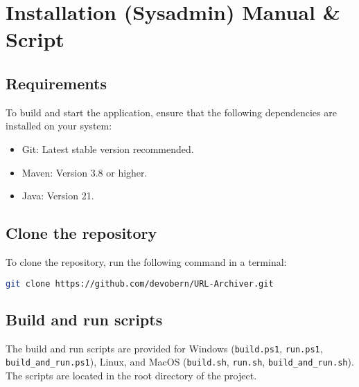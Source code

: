 
\section{Installation (Sysadmin) Manual \& Script} \label{sec::installation_manual}
\subsection{Requirements}

To build and start the application, ensure that the following dependencies are installed on your system:
\begin{itemize}
	\item Git: Latest stable version recommended.
	\item Maven: Version 3.8 or higher.
	\item Java: Version 21.
\end{itemize}

\subsection{Clone the repository}

To clone the repository, run the following command in a terminal:

\begin{lstlisting}[language=bash]
git clone https://github.com/devobern/URL-Archiver.git
\end{lstlisting}

\subsection{Build and run scripts}

The build and run scripts are provided for Windows (\texttt{build.ps1}, \texttt{run.ps1}, \texttt{build\_and\_run.ps1}), Linux, and
MacOS (\texttt{build.sh}, \texttt{run.sh}, \texttt{build\_and\_run.sh}). The scripts are located in the root directory of the project.

